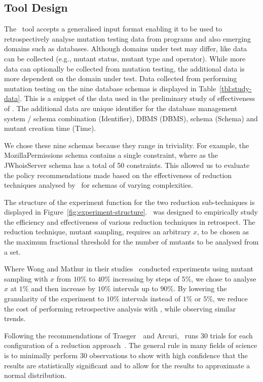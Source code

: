 \subsection{Tool Design}

The \mr~tool accepts a generalised input format enabling it to be used to retrospectively analyse mutation testing data
from programs and also emerging domains such as databases.  Although domains under test may differ, like data can be
collected (e.g., mutant status, mutant type and operator). While more data can optionally be collected from mutation
testing, the additional data is more dependent on the domain under test. Data collected from performing mutation testing
on the nine database schemas is displayed in Table~\ref{tbl:study-data}.  This is a snippet of the data used in the
preliminary study of effectiveness of \mr.  The additional data are unique identifier for the database management system
/ schema combination (Identifier), DBMS (DBMS), schema (Schema) and mutant creation time (Time).

We chose these nine schemas because they range in triviality. For example, the MozillaPermissions schema contains a
single constraint, where as the JWhoisServer schema has a total of 50 constraints. This allowed us to evaluate the
policy recommendations made based on the effectiveness of reduction techniques analysed by \mr~for schemas of varying
complexities.

The structure of the experiment function for the two reduction sub-techniques is displayed in
Figure~\ref{fig:experiment-structure}. \mr~was designed to empirically study the efficiency and effectiveness of various
reduction techniques in retrospect. The reduction technique, mutant sampling, requires an arbitrary $x$, to be chosen as
the maximum fractional threshold for the number of mutants to be analysed from a set.

Where Wong and Mathur in their studies~\cite{mathur1994empirical, wong1993mutation} conducted experiments using mutant
sampling with $x$ from $10\%$ to $40\%$ increasing by steps of $5\%$, we chose to analyse $x$ at $1\%$ and then increase
by $10\%$ intervals up to $90\%$. By lowering the granularity of the experiment to $10\%$ intervals instead of $1\%$ or
$5\%$, we reduce the cost of performing retrospective analysis with \mr, while observing similar trends.

Following the recommendations of Traeger~\etal~and Arcuri, \mr~runs 30 trials for each configuration of a reduction
approach~\cite{traeger2008nine, arcuri2014hitchhiker}. The general rule in many fields of science is to minimally
perform 30 observations to show with high confidence that the results are statistically significant and to allow for the
results to approximate a normal distribution.
